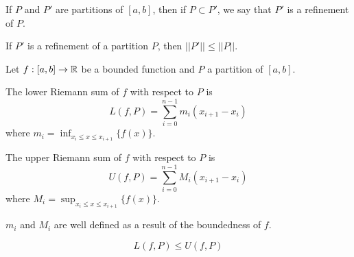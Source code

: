 \documentclass[a4paper,10pt]{article}
\begin{document}
\begin{defn}[Refinement]
	If $P$ and $P'$ are partitions of $[a,b]$, then if $P \subset
	P'$, we say that $P'$ is a refinement of $P$.
\end{defn}

\begin{rem}
	If $P'$ is a refinement of a partition $P$, then $||P'|| \leq ||P||$.
\end{rem}

\begin{defn}
	Let $f:[a,b] \to \mathbb{R}$ be a bounded function and $P$ a partition of $[a,b]$.

	The lower Riemann sum of $f$ with respect to $P$ is
	\[ L(f,P) = \sum_{i=0}^{n-1} m_i (x_{i+1} - x_i) \]
	where $m_i = \inf_{x_i \leq x \leq x_{i+1}} \{f(x)\}$.

	The upper Riemann sum of $f$ with respect to $P$ is
	\[ U(f,P) = \sum_{i=0}^{n-1} M_i (x_{i+1} - x_i) \]
	where $M_i = \sup_{x_i \leq x \leq x_{i+1}} \{f(x)\}$.

	$m_i$ and $M_i$ are well defined as a result of the boundedness of $f$.
\end{defn}

\begin{rem}
	\[ L(f,P) \leq U(f,P) \]
\end{rem}
\end{document}
